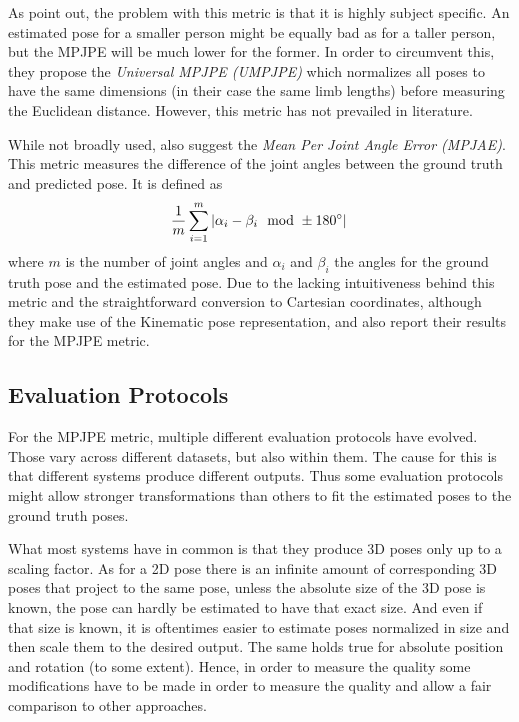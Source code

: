 As \citet{ionescu14} point out, the problem with this metric is that it is highly subject specific.
An estimated pose for a smaller person might be equally bad as for a taller person, but the MPJPE will be much lower for the former.
In order to circumvent this, they propose the \emph{Universal MPJPE (UMPJPE)} which normalizes all poses to have the same dimensions (in their case the same limb lengths) before measuring the Euclidean distance.
However, this metric has not prevailed in literature.

While not broadly used, \citet{ionescu14} also suggest the \emph{Mean Per Joint Angle Error (MPJAE)}.
This metric measures the difference of the joint angles between the ground truth and predicted pose.
It is defined as
\begin{equation}
\frac{1}{m} \sum_{i = 1}^{m} \abs{\alpha_i - \beta_i \mod \pm 180\degree} \,
\end{equation}
where $m$ is the number of joint angles and $\alpha_i$ and $\beta_i$ the angles for the ground truth pose and the estimated pose.
Due to the lacking intuitiveness behind this metric and the straightforward conversion to Cartesian coordinates, although they make use of the Kinematic pose representation, \citet{jahangiri17} and \citet{zhou16_2} also report their results for the MPJPE metric.

\subsection{Evaluation Protocols}

For the MPJPE metric, multiple different evaluation protocols have evolved.
Those vary across different datasets, but also within them.
The cause for this is that different systems produce different outputs. 
Thus some evaluation protocols might allow stronger transformations than others to fit the estimated poses to the ground truth poses.

What most systems have in common is that they produce 3D poses only up to a scaling factor.
As for a 2D pose there is an infinite amount of corresponding 3D poses that project to the same pose, unless the absolute size of the 3D pose is known, the pose can hardly be estimated to have that exact size.
And even if that size is known, it is oftentimes easier to estimate poses normalized in size and then scale them to the desired output.
The same holds true for absolute position and rotation (to some extent).
Hence, in order to measure the quality some modifications have to be made in order to measure the quality and allow a fair comparison to other approaches.

